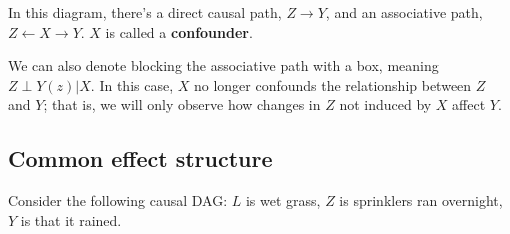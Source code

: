 \begin{example}
In this diagram, there's a direct causal path, $Z\rightarrow Y$, and an associative path, $Z \leftarrow X \rightarrow Y$. $X$ is called a \textbf{confounder}.

\begin{center}
\end{center}

We can also denote blocking the associative path with a box, meaning $Z \perp Y(z) | X$. In this case, $X$ no longer confounds the relationship between $Z$ and $Y$; that is, we will only observe how changes in $Z$ not induced by $X$ affect $Y$.

\begin{center}
\end{center}
\end{example}

\subsection{Common effect structure}

\begin{example}
Consider the following causal DAG: $L$ is wet grass, $Z$ is sprinklers ran overnight, $Y$ is that it rained.

\begin{center}
\end{center}
\end{example}


